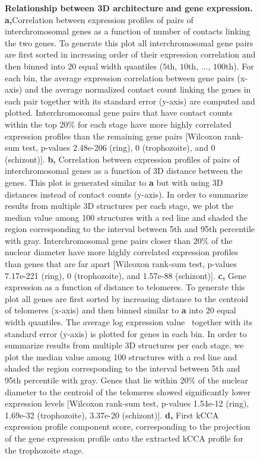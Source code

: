 \documentclass[10pt]{article}
\begin{document}
 
\begin{figure}[h]
\centering
\caption{{\bf Relationship between 3D architecture and gene expression.}
\textbf{a,}Correlation between expression profiles of pairs of interchromosomal genes as a function of number of contacts linking the two genes. To generate this plot all interchromosomal gene pairs are first sorted in increasing order of their expression correlation and then binned into 20 equal width quantiles ($5$th, $10$th, ..., $100$th). For each bin, the average expression correlation between gene pairs (x-axis) and the average normalized contact count linking the genes in each pair together with its standard error (y-axis) are computed and plotted. Interchromosomal gene pairs that have contact counts within the top 20\% for each stage have more highly correlated expression profiles than the remaining gene pairs [Wilcoxon rank-sum test, p-values 2.48e-206 (ring), 0 (trophozoite), and 0 (schizont)].
\textbf{b,} Correlation between expression profiles of pairs of interchromosomal genes as a function of 3D distance between the genes. This plot is generated similar to \textbf{a} but with using 3D distances instead of contact counts (y-axis). In order to summarize results from multiple 3D structures per each stage, we plot the median value among 100 structures with a red line and shaded the region corresponding to the interval between 5th and 95th percentile with gray. Interchromosomal gene pairs closer than 20\% of the nuclear diameter have more highly correlated expression profiles than genes that are far apart [Wilcoxon rank-sum test, p-values 7.17e-221 (ring), 0 (trophozoite), and 1.57e-88 (schizont)].
\textbf{c,} Gene expression as a function of distance to telomeres. To generate this plot all genes are first sorted by increasing distance to the centroid of telomeres (x-axis) and then binned similar to \textbf{a} into 20 equal width quantiles. The average log expression value~\citep{bunnik:polysome}
together with its standard error (y-axis) is plotted for genes in each bin. In order to summarize results from multiple 3D structures per each stage, we plot the median value among 100 structures with a red line and shaded the region corresponding to the interval between 5th and 95th percentile with gray. Genes that lie within 20\% of the nuclear diameter to the centroid of the telomeres showed significantly lower expression levels [Wilcoxon rank-sum test, p-values 1.54e-12 (ring), 1.69e-32 (trophozoite), 3.37e-20 (schizont)].
\textbf{d,} First kCCA expression profile component score, corresponding to the projection of the gene expression profile onto the extracted kCCA profile for the trophozoite stage.}
\label{fig:fig6}
\end{figure}

\clearpage



%
 
\end{document}
